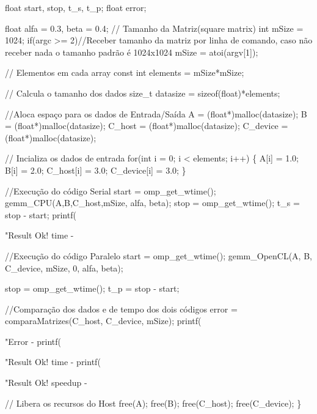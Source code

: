 \begin{DoxyCodeInclude}
    \textcolor{keywordtype}{float} start, stop, t\_s, t\_p;
    \textcolor{keywordtype}{float} error;

    \textcolor{keywordtype}{float} alfa = 0.3, beta = 0.4;
    \textcolor{comment}{// Tamanho da Matriz(square matrix)}
    \textcolor{keywordtype}{int} mSize = 1024;
    \textcolor{keywordflow}{if}(argc >= 2)\textcolor{comment}{//Receber tamanho da matriz por linha de comando, caso não receber nada o tamanho padrão é
       1024x1024}
        mSize = atoi(argv[1]);

    \textcolor{comment}{// Elementos em cada array}
    \textcolor{keyword}{const} \textcolor{keywordtype}{int} elements = mSize*mSize;

    \textcolor{comment}{// Calcula o tamanho dos dados}
    \textcolor{keywordtype}{size\_t} datasize = \textcolor{keyword}{sizeof}(float)*elements;

    \textcolor{comment}{//Aloca espaço para os dados de Entrada/Saída}
    A = (\textcolor{keywordtype}{float}*)malloc(datasize);
    B = (\textcolor{keywordtype}{float}*)malloc(datasize);
    C\_host = (\textcolor{keywordtype}{float}*)malloc(datasize);
    C\_device = (\textcolor{keywordtype}{float}*)malloc(datasize);

    \textcolor{comment}{// Incializa os dados de entrada}
    \textcolor{keywordflow}{for}(\textcolor{keywordtype}{int} i = 0; i < elements; i++) \{
        A[i] = 1.0;
        B[i] = 2.0;
        C\_host[i] = 3.0;
        C\_device[i] = 3.0;
    \}

    \textcolor{comment}{//Execução do código Serial}
    start = omp\_get\_wtime();
    gemm\_CPU(A,B,C\_host,mSize, alfa, beta);
    stop = omp\_get\_wtime();
    t\_s = stop - start;
    printf(\textcolor{stringliteral}{"Result Ok! time - %

    \textcolor{comment}{//Execução do código Paralelo}
    start = omp\_get\_wtime();
    gemm\_OpenCL(A, B, C\_device, mSize, 0,  alfa,  beta);

    stop = omp\_get\_wtime();
    t\_p = stop - start;

    \textcolor{comment}{//Comparação dos dados e de tempo dos dois códigos}
    error = comparaMatrizes(C\_host, C\_device, mSize);
    printf(\textcolor{stringliteral}{"Error - %
    printf(\textcolor{stringliteral}{"Result Ok! time - %
    printf(\textcolor{stringliteral}{"Result Ok! speedup - %

    \textcolor{comment}{// Libera os recursos do Host}
    free(A);
    free(B);
    free(C\_host);
    free(C\_device);
\}


}}}}
\end{DoxyCodeInclude}
